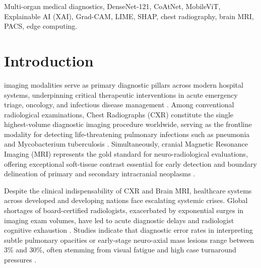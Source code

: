 \documentclass[journal]{IEEEtran}
\begin{document}
\begin{IEEEkeywords}
Multi-organ medical diagnostics, DenseNet-121, CoAtNet, MobileViT, Explainable AI (XAI), Grad-CAM, LIME, SHAP, chest radiography, brain MRI, PACS, edge computing.
\end{IEEEkeywords}

\section{Introduction}
 imaging modalities serve as primary diagnostic pillars across modern hospital systems, underpinning critical therapeutic interventions in acute emergency triage, oncology, and infectious disease management \cite{wang2023, rajpurkar2017chexnet}. Among conventional radiological examinations, Chest Radiographs (CXR) constitute the single highest-volume diagnostic imaging procedure worldwide, serving as the frontline modality for detecting life-threatening pulmonary infections such as pneumonia and Mycobacterium tuberculosis \cite{who2023report, kermany2018identifying}. Simultaneously, cranial Magnetic Resonance Imaging (MRI) represents the gold standard for neuro-radiological evaluations, offering exceptional soft-tissue contrast essential for early detection and boundary delineation of primary and secondary intracranial neoplasms \cite{menze2014multimodal, bauer2013survey}.

Despite the clinical indispensability of CXR and Brain MRI, healthcare systems across developed and developing nations face escalating systemic crises. Global shortages of board-certified radiologists, exacerbated by exponential surges in imaging exam volumes, have led to acute diagnostic delays and radiologist cognitive exhaustion \cite{branstetter2020radiologist, litjens2017survey}. Studies indicate that diagnostic error rates in interpreting subtle pulmonary opacities or early-stage neuro-axial mass lesions range between 3\% and 30\%, often stemming from visual fatigue and high case turnaround pressures \cite{berlin2014malpractice}. 
\end{document}
